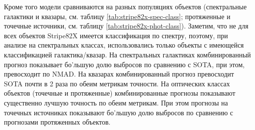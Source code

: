 \documentclass[fleqn,usenatbib]{mnras}
\begin{document}
Кроме того модели сравниваются на разных популяциях объектов (спектральные галактики и квазары, см. таблицу \ref{tab:stripe82x-spec-class}; протяженные и точечные источники, см. таблицу \ref{tab:stripe82x-phot-class}). Заметим, что не для всех объектов Stripe82X имеется классификация по спектру, поэтому, при анализе на спектральных классах, использовались только объекты с имеющейся классификацией галактика/квазар. На спектральных галактиках комбинированный прогноз показывает бо'льшую долю выбросов по сравнению с SOTA, при этом, превосходит по NMAD. На квазарах комбинированный прогноз превосходит SOTA почти в 2 раза по обеим метрикам точности. На оптических классах объектов (точечные и протяженные) комбинированные прогнозы показывают существенно лучшую точность по обеим метрикам. При этом прогнозы на точечных источниках показывают бо'льшую долю выбросов по сравнению с прогнозами протяженных объектов. 
\end{document}
